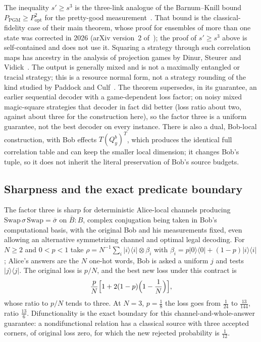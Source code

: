 The inequality $s'\ge s^3$ is the three-link analogue of the Barnum--Knill bound $P_{\mathrm{PGM}}\ge P_{\mathrm{opt}}^2$ for the
pretty-good measurement~\cite{BK02}. That bound is the classical-fidelity case of their main theorem, whose proof for ensembles of
more than one state was corrected in 2026 (arXiv version~2 of~\cite{BK02}); the proof of $s'\ge s^3$ above is self-contained and does
not use it. Squaring a strategy through such correlation maps has ancestry in the analysis of projection games by Dinur, Steurer
and Vidick~\cite[Lemma~6]{DSV15}. The output is generally mixed and is not a maximally
entangled or tracial strategy; this is a resource normal form, not a strategy rounding of the kind studied by Paddock and
Culf~\cite{Pad22,Cul26}. The theorem supersedes, in its guarantee, an earlier sequential decoder with a game-dependent loss
factor; on noisy mixed magic-square strategies that decoder in fact did better (loss ratio about two, against about three for
the construction here), so the factor three is a uniform guarantee, not the best decoder on every instance. There is also a dual, Bob-local
construction, with Bob effects $T(Q^b_y)^T$, which produces the identical full correlation table and can keep the smaller
local dimension; it changes Bob's tuple, so it does not inherit the literal preservation of Bob's source budgets.

\subsection{Sharpness and the exact predicate boundary}\label{sec:factor-three-sharp}

\begin{theorem}\label{thm:factor-three-sharp}
The factor three is sharp for deterministic Alice-local channels producing $\mathrm{Swap}\,\sigma\,\mathrm{Swap}=\bar\sigma$ on
$\bar B:B$, complex conjugation being taken in Bob's computational basis, with the original Bob and his measurements fixed, even allowing an alternative symmetrizing channel and
optimal legal decoding. For $N\ge2$ and $0<p<1$ take
$\rho=N^{-1}\sum_i|i\rangle\langle i|\otimes\beta_i$ with $\beta_i=p|0\rangle\langle0|+(1-p)|i\rangle\langle i|$; Alice's answers are the $N$
one-hot words, Bob is asked a uniform $j$ and tests $|j\rangle\langle j|$. The original loss is $p/N$, and the best new loss under
this contract is
\[
\frac pN\Bigl[1+2(1-p)\Bigl(1-\frac1N\Bigr)\Bigr],
\]
whose ratio to $p/N$ tends to three. At $N=3$, $p=\frac18$ the loss goes from $\frac1{24}$ to $\frac{13}{144}$, ratio $\frac{13}6$.
Difunctionality is the exact boundary for this channel-and-whole-answer guarantee: a nondifunctional relation has a
classical source with three accepted corners, of original loss zero, for which the new rejected probability is $\frac1{12}$.
\end{theorem}

